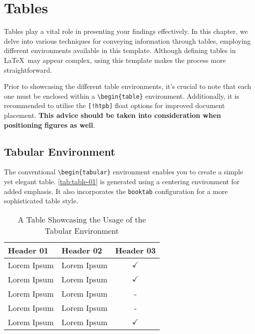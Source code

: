 \chapter{Tables}
Tables play a vital role in presenting your findings effectively. In this chapter, we delve into various techniques for conveying information through tables, employing different environments available in this template. Although defining tables in \LaTeX\ may appear complex, using this template makes the process more straightforward.

\begin{importantbox}
    Prior to showcasing the different table environments, it's crucial to note that each one must be enclosed within a \verb|\begin{table}| environment. Additionally, it is recommended to utilise the \verb|[!htpb]| float options for improved document placement. \textbf{This advice should be taken into consideration when positioning figures as well}.
\end{importantbox}

\section{Tabular Environment}
The conventional \verb|\begin{tabular}| environment enables you to create a simple yet elegant table. \autoref{tab:table-01} is generated using a centering environment for added emphasis. It also incorporates the \verb|booktab| configuration for a more sophisticated table style.

\begin{table}[!htpb]
    \caption{A Table Showcasing the Usage of the Tabular Environment}
    \label{tab:table-01}
    \centering
    \begin{tabular}{llc}
        \toprule
        Header 01 & Header 02 & Header 03 \\ 
        \midrule
        Lorem Ipsum & Lorem Ipsum & $\checkmark$ \\
        Lorem Ipsum & Lorem Ipsum & $\checkmark$ \\
        Lorem Ipsum & Lorem Ipsum & - \\
        Lorem Ipsum & Lorem Ipsum & - \\
        Lorem Ipsum & Lorem Ipsum & $\checkmark$ \\
        \bottomrule
    \end{tabular}
\end{table}

